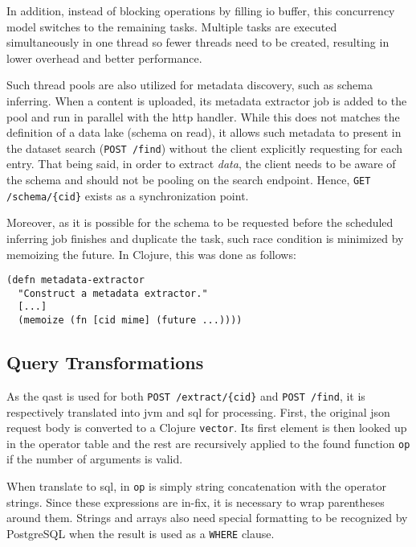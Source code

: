In addition, instead of blocking operations by filling \gls{io} buffer,
this concurrency model switches to the remaining tasks.  Multiple tasks
are executed simultaneously in one thread so fewer threads need to be created,
resulting in lower overhead and better performance.

Such thread pools are also utilized for metadata discovery, such as
schema inferring.  When a \gls{content} is uploaded, its metadata extractor job
is added to the pool and run in parallel with the \gls{http} handler.
While this does not matches the definition of a data lake (schema on read),
it allows such metadata to present in the dataset search (\verb|POST /find|)
without the client explicitly requesting for each entry.  That being said,
in order to extract \emph{data}, the client needs to be aware of the schema
and should not be pooling on the search endpoint.  Hence,
\verb|GET /schema/{cid}| exists as a synchronization point.

Moreover, as it is possible for the schema to be requested before the scheduled
inferring job finishes and duplicate the task, such race condition is minimized
by memoizing the future.  In Clojure, this was done as follows:
\begin{verbatim}
(defn metadata-extractor
  "Construct a metadata extractor."
  [...]
  (memoize (fn [cid mime] (future ...))))
\end{verbatim}

\subsection{Query Transformations}
As the \gls{qast} is used for both \verb|POST /extract/{cid}|
and \verb|POST /find|, it is respectively translated into \gls{jvm}
and \gls{sql} for processing.  First, the original \gls{json} request body
is converted to a Clojure \verb|vector|.  Its first element is then looked up
in the operator table and the rest are recursively applied to the found function
\verb|op| if the number of arguments is valid.

When translate to \gls{sql}, in \verb|op| is simply string concatenation
with the operator strings.  Since these expressions are in-fix, it is necessary
to wrap parentheses around them.  Strings and arrays also need special
formatting to be recognized by PostgreSQL when the result is used
as a \verb|WHERE| clause.

